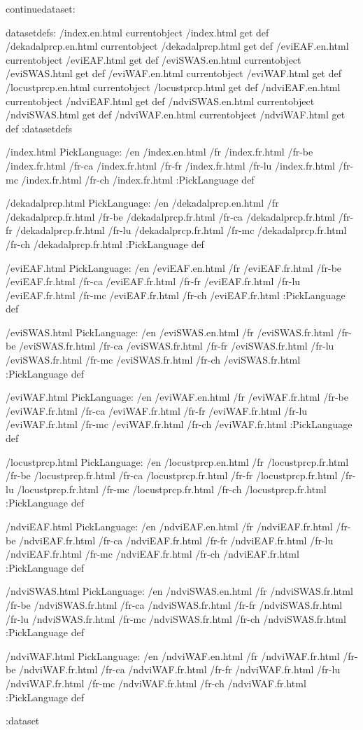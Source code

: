 \begin{ingrid}
continuedataset:

datasetdefs:
/index.en.html currentobject /index.html get def
/dekadalprcp.en.html currentobject /dekadalprcp.html get def
/eviEAF.en.html currentobject /eviEAF.html get def
/eviSWAS.en.html currentobject /eviSWAS.html get def
/eviWAF.en.html currentobject /eviWAF.html get def
/locustprcp.en.html currentobject /locustprcp.html get def
/ndviEAF.en.html currentobject /ndviEAF.html get def
/ndviSWAS.en.html currentobject /ndviSWAS.html get def
/ndviWAF.en.html currentobject /ndviWAF.html get def
:datasetdefs

/index.html {
PickLanguage:
/en /index.en.html
/fr /index.fr.html
/fr-be /index.fr.html
/fr-ca /index.fr.html
/fr-fr /index.fr.html
/fr-lu /index.fr.html
/fr-mc /index.fr.html
/fr-ch /index.fr.html
:PickLanguage
} def

/dekadalprcp.html {
PickLanguage:
/en /dekadalprcp.en.html
/fr /dekadalprcp.fr.html
/fr-be /dekadalprcp.fr.html
/fr-ca /dekadalprcp.fr.html
/fr-fr /dekadalprcp.fr.html
/fr-lu /dekadalprcp.fr.html
/fr-mc /dekadalprcp.fr.html
/fr-ch /dekadalprcp.fr.html
:PickLanguage
} def

/eviEAF.html {
PickLanguage:
/en /eviEAF.en.html
/fr /eviEAF.fr.html
/fr-be /eviEAF.fr.html
/fr-ca /eviEAF.fr.html
/fr-fr /eviEAF.fr.html
/fr-lu /eviEAF.fr.html
/fr-mc /eviEAF.fr.html
/fr-ch /eviEAF.fr.html
:PickLanguage
} def

/eviSWAS.html {
PickLanguage:
/en /eviSWAS.en.html
/fr /eviSWAS.fr.html
/fr-be /eviSWAS.fr.html
/fr-ca /eviSWAS.fr.html
/fr-fr /eviSWAS.fr.html
/fr-lu /eviSWAS.fr.html
/fr-mc /eviSWAS.fr.html
/fr-ch /eviSWAS.fr.html
:PickLanguage
} def

/eviWAF.html {
PickLanguage:
/en /eviWAF.en.html
/fr /eviWAF.fr.html
/fr-be /eviWAF.fr.html
/fr-ca /eviWAF.fr.html
/fr-fr /eviWAF.fr.html
/fr-lu /eviWAF.fr.html
/fr-mc /eviWAF.fr.html
/fr-ch /eviWAF.fr.html
:PickLanguage
} def

/locustprcp.html {
PickLanguage:
/en /locustprcp.en.html
/fr /locustprcp.fr.html
/fr-be /locustprcp.fr.html
/fr-ca /locustprcp.fr.html
/fr-fr /locustprcp.fr.html
/fr-lu /locustprcp.fr.html
/fr-mc /locustprcp.fr.html
/fr-ch /locustprcp.fr.html
:PickLanguage
} def

/ndviEAF.html {
PickLanguage:
/en /ndviEAF.en.html
/fr /ndviEAF.fr.html
/fr-be /ndviEAF.fr.html
/fr-ca /ndviEAF.fr.html
/fr-fr /ndviEAF.fr.html
/fr-lu /ndviEAF.fr.html
/fr-mc /ndviEAF.fr.html
/fr-ch /ndviEAF.fr.html
:PickLanguage
} def

/ndviSWAS.html {
PickLanguage:
/en /ndviSWAS.en.html
/fr /ndviSWAS.fr.html
/fr-be /ndviSWAS.fr.html
/fr-ca /ndviSWAS.fr.html
/fr-fr /ndviSWAS.fr.html
/fr-lu /ndviSWAS.fr.html
/fr-mc /ndviSWAS.fr.html
/fr-ch /ndviSWAS.fr.html
:PickLanguage
} def

/ndviWAF.html {
PickLanguage:
/en /ndviWAF.en.html
/fr /ndviWAF.fr.html
/fr-be /ndviWAF.fr.html
/fr-ca /ndviWAF.fr.html
/fr-fr /ndviWAF.fr.html
/fr-lu /ndviWAF.fr.html
/fr-mc /ndviWAF.fr.html
/fr-ch /ndviWAF.fr.html
:PickLanguage
} def

:dataset
\end{ingrid}

